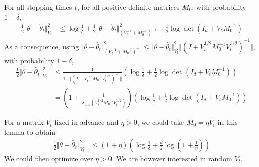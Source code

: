 \begin{lemma}\label{lem:concentration}
For all stopping times $t$, for all positive definite matrices $M_0$, with probability $1- \delta$,
\begin{align*}
\frac{1}{2} \Vert \theta - \hat{\theta}_t \Vert^2_{V_t}
&\le \log\frac{1}{\delta} + \frac{1}{2} \Vert \theta - \hat{\theta}_t \Vert_{(V_t^{-1} + M_0^{-1})^{-1}}^2 + \frac{1}{2} \log \det (I_d + V_t M_0^{-1})
\end{align*}
As a consequence, using $\Vert \theta - \hat{\theta}_t \Vert_{(V_t^{-1} + M_0^{-1})^{-1}}^2 \le \Vert \theta - \hat{\theta}_t \Vert_{V_t}^2 \Vert (I + V_t^{1/2} M_0^{-1}V_t^{1/2})^{-1} \Vert$, with probability $1- \delta$,
\begin{align*}
\frac{1}{2} \Vert \theta - \hat{\theta}_t \Vert^2_{V_t}
&\le \frac{1}{1 - \Vert (I + V_t^{1/2} M_0^{-1}V_t^{1/2})^{-1} \Vert}\left( \log\frac{1}{\delta} + \frac{1}{2} \log \det (I_d + V_t M_0^{-1})\right)
\\
&= \left( 1 + \frac{1}{\lambda_{\min} (V_t^{1/2} M_0^{-1}V_t^{1/2})}\right) \left( \log\frac{1}{\delta} + \frac{1}{2} \log \det (I_d + V_t M_0^{-1})\right)
\end{align*}
\end{lemma}

For a matrix $V_t$ fixed in advance and $\eta>0$, we could take $M_0 = \eta V_t$ in this lemma to obtain
\begin{align*}
\frac{1}{2} \Vert \theta - \hat{\theta}_t \Vert^2_{V_t}
&\le (1+\eta)\left(\log\frac{1}{\delta} + \frac{d}{2} \log (1 + \frac{1}{\eta})\right)
\end{align*}
We could then optimize over $\eta>0$. We are however interested in random $V_t$.

